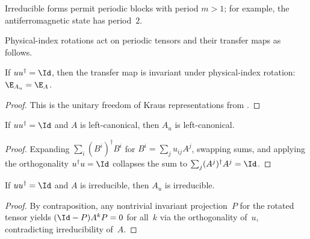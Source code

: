\begin{remark}
    \label{rem:irreducible_form_higher_periods}
    \notready
    Irreducible forms permit periodic blocks with period $m > 1$; for
    example, the antiferromagnetic state has period~$2$.
\end{remark}

Physical-index rotations act on periodic tensors and their transfer maps as
follows.

\begin{lemma}%
    \label{thm:transfer_map_rotate_physical}
    \leanok
    If $uu^\dagger=\Id$, then the transfer map is invariant under
    physical-index rotation: $\E_{A_u}=\E_A$.
\end{lemma}

\begin{proof}\leanok
    This is the unitary freedom of Kraus representations from
    \cite[Theorem~2.1(4)]{Wolf2012Quantum}.
\end{proof}

\begin{lemma}%
    \label{thm:left_canonical_rotate_physical}
    \leanok
    If $uu^\dagger=\Id$ and $A$ is left-canonical, then
    $A_u$ is left-canonical.
\end{lemma}

\begin{proof}\leanok
    Expanding $\sum_i(B^i)^\dagger B^i$ for $B^i=\sum_j u_{ij}A^j$,
    swapping sums, and applying the orthogonality $u^\dagger u=\Id$ collapses
    the sum to $\sum_j(A^j)^\dagger A^j=\Id$.
\end{proof}

\begin{lemma}%
    \label{thm:irreducible_tensor_rotate_physical}
    \leanok
    If $uu^\dagger=\Id$ and $A$ is irreducible, then
    $A_u$ is irreducible.
\end{lemma}

\begin{proof}\leanok
    By contraposition, any nontrivial invariant projection~$P$ for the
    rotated tensor yields $(\Id-P)A^kP=0$ for all~$k$ via the
    orthogonality of~$u$, contradicting irreducibility of~$A$.
\end{proof}

